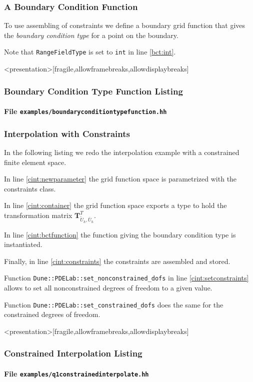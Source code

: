 \begin{frame}
\frametitle<presentation>{A Boundary Condition Function}
To use assembling of constraints 
we define a boundary grid function that gives the \textit{boundary
condition type} for a point on the boundary.

Note that \lstinline{RangeFieldType} is set to \lstinline{int} in
line \ref{bct:int}.
\end{frame}

\begin{frame}<presentation>[fragile,allowframebreaks,allowdisplaybreaks]
\frametitle<presentation>{Boundary Condition Type Function Listing}
\framesubtitle<presentation>{File \texttt{examples/boundaryconditiontypefunction.hh}}

\end{frame}

\begin{frame}
\frametitle<presentation>{Interpolation with Constraints}
In the following listing we redo the interpolation example 
with a constrained finite element space.

In line \ref{cint:newparameter} the grid function space is
parametrized with the constraints class.

In line \ref{cint:container} the grid function space exports a type to
hold the transformation matrix
$\mathbf{T}^T_{\tilde{U}_h,\bar{U}_h}$. 

In line \ref{cint:bctfunction} the function giving the boundary
condition type is instantiated.

Finally, in line \ref{cint:constraints} the constraints are assembled
and stored.

Function \lstinline{Dune::PDELab::set_nonconstrained_dofs} in
line \ref{cint:setconstraints} allows to set all nonconstrained
degrees of freedom to a given value.

Function \lstinline{Dune::PDELab::set_constrained_dofs} does the same
for the constrained degrees of freedom.
\end{frame}


\begin{frame}<presentation>[fragile,allowframebreaks,allowdisplaybreaks]
\frametitle<presentation>{Constrained Interpolation Listing}
\framesubtitle<presentation>{File \texttt{examples/q1constrainedinterpolate.hh}}

\end{frame}

